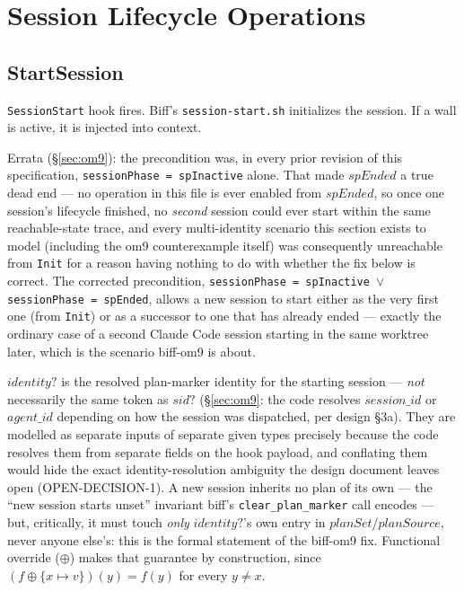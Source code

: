 \documentclass[a4paper,10pt,fleqn]{article}
\begin{document}
\section{Session Lifecycle Operations}

\subsection{StartSession}

\texttt{SessionStart} hook fires. Biff's \texttt{session-start.sh}
initializes the session. If a wall is active, it is injected into
context.

Errata (\S\ref{sec:om9}): the precondition was, in every prior revision
of this specification, \texttt{sessionPhase = spInactive} alone. That
made $spEnded$ a true dead end --- no operation in this file is ever
enabled from $spEnded$, so once one session's lifecycle finished, no
\emph{second} session could ever start within the same reachable-state
trace, and every multi-identity scenario this section exists to model
(including the om9 counterexample itself) was consequently unreachable
from \texttt{Init} for a reason having nothing to do with whether the
fix below is correct. The corrected precondition,
\texttt{sessionPhase = spInactive $\lor$ sessionPhase = spEnded},
allows a new session to start either as the very first one (from
\texttt{Init}) or as a successor to one that has already ended ---
exactly the ordinary case of a second Claude Code session starting in
the same worktree later, which is the scenario biff-om9 is about.

$identity?$ is the resolved plan-marker identity for the starting
session --- \emph{not} necessarily the same token as $sid?$
(\S\ref{sec:om9}: the code resolves $session\_id$ or $agent\_id$
depending on how the session was dispatched, per design \S3a).  They are
modelled as separate inputs of separate given types precisely because
the code resolves them from separate fields on the hook payload, and
conflating them would hide the exact identity-resolution ambiguity the
design document leaves open (OPEN-DECISION-1).  A new session inherits
no plan of its own --- the ``new session starts unset'' invariant biff's
\texttt{clear\_plan\_marker} call encodes --- but, critically, it must
touch \emph{only} $identity?$'s own entry in $planSet$/$planSource$,
never anyone else's: this is the formal statement of the biff-om9 fix.
Functional override ($\oplus$) makes that guarantee by construction,
since $(f \oplus \{x \mapsto v\})(y) = f(y)$ for every $y \neq x$.
\end{document}
